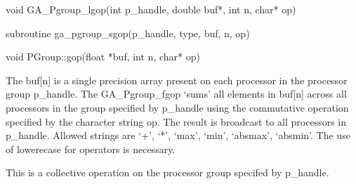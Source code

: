 \documentclass[12pt]{article}
\begin{document}

\begin{capi}
\begin{ccode}
void GA_Pgroup_lgop(int p_handle, double buf*, int n, char* op)
\end{ccode}
\begin{funcargs}
\end{funcargs}
\end{capi}

\begin{fapi}
\begin{fcode}
subroutine ga_pgroup_sgop(p_handle, type, buf, n, op)
\end{fcode}
\begin{funcargs}
\end{funcargs}
\end{fapi}

\begin{cxxapi}
\begin{cxxcode}
void PGroup::gop(float *buf, int n, char* op)
\end{cxxcode}
\begin{funcargs}
\end{funcargs}
\end{cxxapi}
\gcoll
\begin{desc}

The buf[n] is a single precision array present on each processor in the processor group p_handle. The GA_Pgroup_fgop `sums' all elements in buf[n] across all processors in the group specified by p_handle using the commutative operation specified by the character string op.  The result is broadcast to all processors in p_handle. Allowed strings are `+', `*', `max', `min', `absmax', `absmin'. The use of lowerecase for operators is necessary.

This is a collective operation on the processor group specifed by p_handle.
\end{desc}

\end{document}
